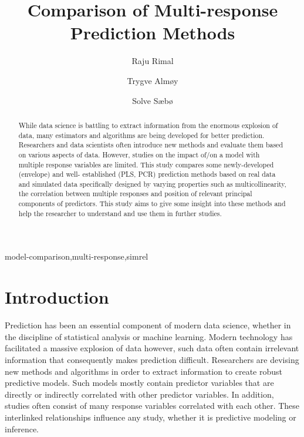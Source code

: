 \documentclass[review]{elsarticle}
\begin{document}
\begin{frontmatter}

  \title{Comparison of Multi-response Prediction Methods}
  
    \author[KBM]{Raju Rimal}
    \author[KBM]{Trygve Almøy}
  
    \author[NMBU]{Solve Sæbø}
  
      \address[KBM]{Faculty of Chemistry and Bioinformatics, Norwegian University of Life
Sciences, Ås, Norway}
    \address[NMBU]{Professor, Norwegian University of Life Sciences, Ås, Norway}
  
  \begin{abstract}
  While data science is battling to extract information from the enormous
  explosion of data, many estimators and algorithms are being developed
  for better prediction. Researchers and data scientists often introduce
  new methods and evaluate them based on various aspects of data. However,
  studies on the impact of/on a model with multiple response variables are
  limited. This study compares some newly-developed (envelope) and well-
  established (PLS, PCR) prediction methods based on real data and
  simulated data specifically designed by varying properties such as
  multicollinearity, the correlation between multiple responses and
  position of relevant principal components of predictors. This study aims
  to give some insight into these methods and help the researcher to
  understand and use them in further studies.
  \end{abstract}
   \begin{keyword} model-comparison,multi-response,simrel\end{keyword}

\end{frontmatter}

\section{Introduction}\label{introduction}

Prediction has been an essential component of modern data science,
whether in the discipline of statistical analysis or machine learning.
Modern technology has facilitated a massive explosion of data however,
such data often contain irrelevant information that consequently makes
prediction difficult. Researchers are devising new methods and
algorithms in order to extract information to create robust predictive
models. Such models mostly contain predictor variables that are directly
or indirectly correlated with other predictor variables. In addition,
studies often consist of many response variables correlated with each
other. These interlinked relationships influence any study, whether it
is predictive modeling or inference.
\end{document}
